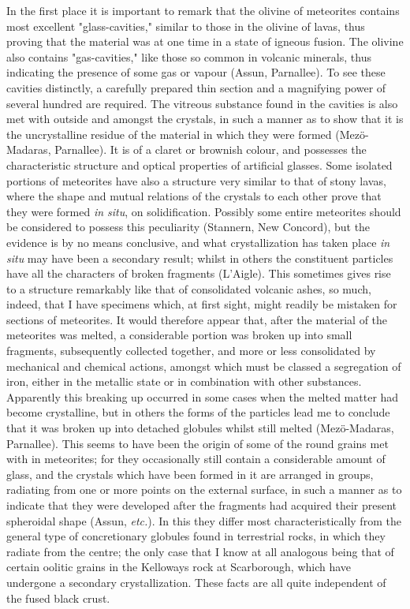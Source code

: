 \documentclass[a4paper, 12pt, oneside]{article}
\begin{document}
In the first place it is important to remark that the olivine of meteorites contains most excellent "glass-cavities," similar to those in the olivine of lavas, thus proving that the material was at one time in a state of igneous fusion. The olivine also contains "gas-cavities," like those so common in volcanic minerals, thus indicating the presence of some gas or vapour (Assun, Parnallee). To see these cavities distinctly, a carefully prepared thin section and a magnifying power of several hundred are required. The vitreous substance found in the cavities is also met with outside and amongst the crystals, in such a manner as to show that it is the uncrystalline residue of the material in which they were formed (Mezö-Madaras, Parnallee). It is of a claret or brownish colour, and possesses the characteristic structure and optical properties of artificial glasses. Some isolated portions of meteorites have also a structure very similar to that of stony lavas, where the shape and mutual relations of the crystals to each other prove that they were formed \emph{in situ}, on solidification. Possibly some entire meteorites should be considered to possess this peculiarity (Stannern, New Concord), but the evidence is by no means conclusive, and what crystallization has taken place \emph{in situ} may have been a secondary result; whilst in others the constituent particles have all the characters of broken fragments (L'Aigle). This sometimes gives rise to a structure remarkably like that of consolidated volcanic ashes, so much, indeed, that I have specimens which, at first sight, might readily be mistaken for sections of meteorites. It would therefore appear that, after the material of the meteorites was melted, a considerable portion was broken up into small fragments, subsequently collected together, and more or less consolidated by mechanical and chemical actions, amongst which must be classed a segregation of iron, either in the metallic state or in combination with other substances. Apparently this breaking up occurred in some cases when the melted matter had become crystalline, but in others the forms of the particles lead me to conclude that it was broken up into detached globules whilst still melted (Mezö-Madaras, Parnallee). This seems to have been the origin of some of the round grains met with in meteorites; for they occasionally still contain a considerable amount of glass, and the crystals which have been formed in it are arranged in groups, radiating from one or more points on the external surface, in such a manner as to indicate that they were developed after the fragments had acquired their present spheroidal shape (Assun, \emph{etc.}). In this they differ most characteristically from the general type of concretionary globules found in terrestrial rocks, in which they radiate from the centre; the only case that I know at all analogous being that of certain oolitic grains in the Kelloways rock at Scarborough, which have undergone a secondary crystallization. These facts are all quite independent of the fused black crust.
\end{document}
